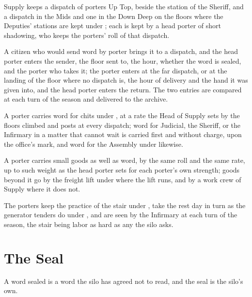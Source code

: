 \begin{clauses}
\item Supply keeps a dispatch of porters Up Top, beside the station of the Sheriff, and a dispatch in the Mids and one in the Down Deep on the floors where the Deputies' stations are kept under ; each is kept by a head porter of short shadowing, who keeps the porters' roll of that dispatch.
\item A citizen who would send word by porter brings it to a dispatch, and the head porter enters the sender, the floor sent to, the hour, whether the word is sealed, and the porter who takes it; the porter enters at the far dispatch, or at the landing of the floor where no dispatch is, the hour of delivery and the hand it was given into, and the head porter enters the return. The two entries are compared at each turn of the season and delivered to the archive.
\item A porter carries word for chits under , at a rate the Head of Supply sets by the floors climbed and posts at every dispatch; word for Judicial, the Sheriff, or the Infirmary in a matter that cannot wait is carried first and without charge, upon the office's mark, and word for the Assembly under  likewise.
\item A porter carries small goods as well as word, by the same roll and the same rate, up to such weight as the head porter sets for each porter's own strength; goods beyond it go by the freight lift under  where the lift runs, and by a work crew of Supply where it does not.
\item The porters keep the practice of the stair under , take the rest day in turn as the generator tenders do under , and are seen by the Infirmary at each turn of the season, the stair being labor as hard as any the silo asks.
\end{clauses}

\section{The Seal}
\label{sec:records:seal}

A word sealed is a word the silo has agreed not to read, and the seal is the silo's own.

